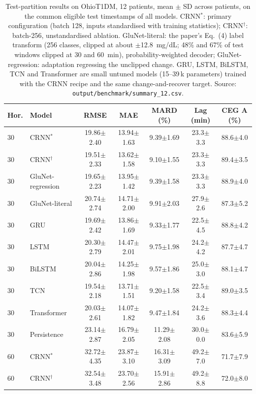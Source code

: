 \documentclass[conference]{IEEEtran}
\begin{document}
\begin{table}[t]\centering\caption{Test-partition results on OhioT1DM, 12 patients, mean $\pm$ SD across patients, on the common eligible test timestamps of all models. CRNN$^{*}$: primary configuration (batch 128, inputs standardised with training statistics); CRNN$^{\dagger}$: batch-256, unstandardised ablation. GluNet-literal: the paper's Eq.~(4) label transform (256 classes, clipped at about $\pm$12.8~mg/dL; 48\% and 67\% of test windows clipped at 30 and 60~min), probability-weighted decoder; GluNet-regression: adaptation regressing the unclipped change. GRU, LSTM, BiLSTM, TCN and Transformer are small untuned models (15--39\,k parameters) trained with the CRNN recipe and the same change-and-recover target. Source: \texttt{output/benchmark/summary\_12.csv}.}
\small\begin{tabular}{llccccc}\toprule
Hor. & Model & RMSE & MAE & MARD (\%) & Lag (min) & CEG A (\%)\\\midrule
30 & CRNN$^{*}$ & 19.86$\pm$2.40 & 13.94$\pm$1.63 & 9.39$\pm$1.69 & 23.3$\pm$3.3 & 88.6$\pm$4.0\\
30 & CRNN$^{\dagger}$ & 19.51$\pm$2.33 & 13.62$\pm$1.58 & 9.10$\pm$1.55 & 23.3$\pm$3.3 & 89.4$\pm$3.5\\
30 & GluNet-regression & 19.65$\pm$2.23 & 13.95$\pm$1.42 & 9.39$\pm$1.58 & 23.3$\pm$3.3 & 88.9$\pm$4.0\\
30 & GluNet-literal & 20.74$\pm$2.74 & 14.71$\pm$2.00 & 9.91$\pm$2.03 & 27.9$\pm$2.6 & 87.3$\pm$5.2\\
30 & GRU & 19.69$\pm$2.42 & 13.86$\pm$1.69 & 9.33$\pm$1.77 & 22.5$\pm$4.5 & 88.8$\pm$4.2\\
30 & LSTM & 20.30$\pm$2.79 & 14.47$\pm$2.01 & 9.75$\pm$1.98 & 24.2$\pm$4.2 & 87.7$\pm$4.7\\
30 & BiLSTM & 20.04$\pm$2.86 & 14.25$\pm$1.98 & 9.57$\pm$1.86 & 25.0$\pm$3.0 & 88.1$\pm$4.7\\
30 & TCN & 19.54$\pm$2.18 & 13.71$\pm$1.51 & 9.20$\pm$1.58 & 22.5$\pm$3.4 & 89.0$\pm$3.5\\
30 & Transformer & 20.03$\pm$2.61 & 14.07$\pm$1.82 & 9.47$\pm$1.84 & 24.2$\pm$3.6 & 88.3$\pm$4.4\\
30 & Persistence & 23.14$\pm$2.87 & 16.79$\pm$2.05 & 11.29$\pm$2.08 & 30.0$\pm$0.0 & 83.6$\pm$5.9\\
\midrule
60 & CRNN$^{*}$ & 32.72$\pm$4.35 & 23.87$\pm$3.10 & 16.31$\pm$3.09 & 49.2$\pm$7.0 & 71.7$\pm$7.9\\
60 & CRNN$^{\dagger}$ & 32.54$\pm$3.48 & 23.70$\pm$2.56 & 15.91$\pm$2.86 & 49.2$\pm$8.8 & 72.0$\pm$8.0\\

\end{tabular}
\end{table}
\end{document}
